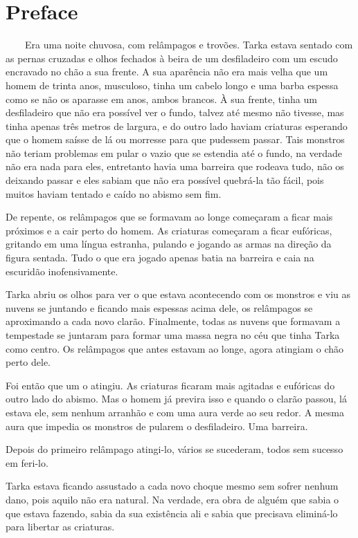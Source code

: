 \chapter*{Preface}

\ \ \ \ Era uma noite chuvosa, com relâmpagos e trovões. Tarka estava sentado com as pernas cruzadas e olhos fechados à beira de um desfiladeiro com um escudo encravado no chão a sua frente. A sua aparência não era mais velha que um homem de trinta anos, musculoso, tinha um cabelo longo e uma barba espessa como se não os aparasse em anos, ambos brancos. À sua frente, tinha um desfiladeiro que não era possível ver o fundo, talvez até mesmo não tivesse, mas tinha apenas três metros de largura, e do outro lado haviam criaturas esperando que o homem saísse de lá ou morresse para que pudessem passar. Tais monstros não teriam problemas em pular o vazio que se estendia até o fundo, na verdade não era nada para eles, entretanto havia uma barreira que rodeava tudo, não os deixando passar e eles sabiam que não era possível quebrá-la tão fácil, pois muitos haviam tentado e caído no abismo sem fim.

De repente, os relâmpagos que se formavam ao longe começaram a ficar mais próximos e a cair perto do homem. As criaturas começaram a ficar eufóricas, gritando em uma língua estranha, pulando e jogando as armas na direção da figura sentada. Tudo o que era jogado apenas batia na barreira e caia na escuridão inofensivamente.

Tarka abriu os olhos para ver o que estava acontecendo com os monstros e viu as nuvens se juntando e ficando mais espessas acima dele, os relâmpagos se aproximando a cada novo clarão. Finalmente, todas as nuvens que formavam a tempestade se juntaram para formar uma massa negra no céu que tinha Tarka como centro. Os relâmpagos que antes estavam ao longe, agora atingiam o chão perto dele. 

Foi então que um o atingiu. As criaturas ficaram mais agitadas e eufóricas do outro lado do abismo. Mas o homem já previra isso e quando o clarão passou, lá estava ele, sem nenhum arranhão e com uma aura verde ao seu redor. A mesma aura que impedia os monstros de pularem o desfiladeiro. Uma barreira.

Depois do primeiro relâmpago atingi-lo, vários se sucederam, todos sem sucesso em feri-lo. 

Tarka estava ficando assustado a cada novo choque mesmo sem sofrer nenhum dano, pois aquilo não era natural. Na verdade, era obra de alguém que sabia o que estava fazendo, sabia da sua existência ali e sabia que precisava eliminá-lo para libertar as criaturas.

